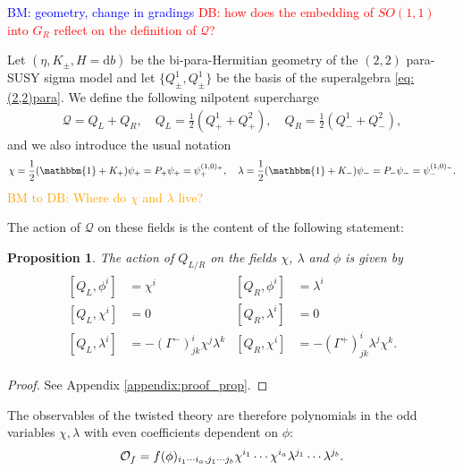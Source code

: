 \documentclass{article}
\newcommand{\QQ}{\mathcal{Q}}
\newcommand{\id}{\mathbbm{1}}
\newcommand{\rd}{\mathrm{d}}
\newtheorem{proposition}[theorem]{Proposition}
\theoremstyle{definition}
\theoremstyle{remark}
\def\brian{\textcolor{blue}{BM: }\textcolor{blue}}
\def\david{\textcolor{red}{DB: }\textcolor{red}}
\def\btd{\textcolor{orange}{BM to DB: }\textcolor{orange}}
\begin{document}
\brian{geometry, change in gradings}
\david{how does the embedding of $SO(1,1)$ into $G_R$ reflect on the definition of $\QQ$?}

Let $(\eta,K_\pm,H=\rd b)$ be the bi-para-Hermitian geometry of the $(2,2)$ para-SUSY sigma model and let $\{Q^1_\pm,Q^1_\pm\}$ be the basis of the superalgebra \eqref{eq:(2,2)para}. We define the following nilpotent supercharge
\begin{align}\label{QQ_nilpotent}
\QQ=Q_L+Q_R,\quad Q_L=\frac{1}{2}(Q^1_++Q^2_+),\quad Q_R=\frac{1}{2}(Q^1_-+Q^2_-),
\end{align}
and we also introduce the usual notation 
\begin{align*}
\chi=\frac{1}{2}(\id+K_+)\psi_+=P_+\psi_+=\psi_+^{(1,0)_+},\quad\lambda=\frac{1}{2}(\id+K_-)\psi_-=P_-\psi_-=\psi_-^{(1,0)_-}.
\end{align*}
\btd{Where do $\chi$ and $\lambda$ live?}

The action of $\QQ$ on these fields is the content of the following statement:
\begin{proposition}\label{prop_toptwist}
The action of $Q_{L/R}$ on the fields $\chi$, $\lambda$ and $\phi$ is given by
\begin{align}\label{eq:Qcoh}
\begin{aligned}
[Q_L,\phi^i]&=\chi^i & [Q_R,\phi^i]&=\lambda^i\\
[Q_L,\chi^i]&=0 & [Q_R,\lambda^i]&=0\\
[Q_L,\lambda^i]&=-(\Gamma^-)^i_{jk}\chi^j\lambda^k & [Q_R,\chi^i]&=-(\Gamma^+)^i_{jk}\lambda^j\chi^k.
\end{aligned}
\end{align}
\end{proposition}
\begin{proof}
See Appendix \ref{appendix:proof_prop}.
\end{proof}


The observables of the twisted theory are therefore polynomials in the odd variables $\chi,\lambda$ with even coefficients dependent on $\phi$:
\begin{align*}
{\cal O}_f=f(\phi)_{i_1\cdots i_a,j_1\cdots j_b}\chi^{i_1}\cdots\chi^{i_a}\lambda^{j_1}\cdots\lambda^{j_b}.
\end{align*}
\end{document}
